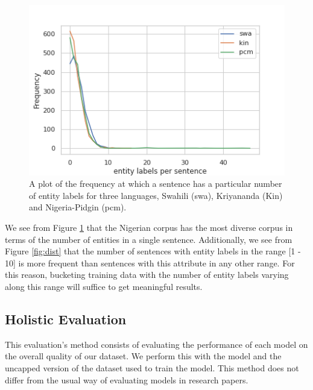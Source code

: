 \documentclass{article}
\begin{document}
\begin{figure}
    \centering
    \includegraphics[width=\columnwidth]{images/evlution.png}
    \caption{A plot of the frequency at which a sentence has a particular number of entity labels for three languages, Swahili (swa), Kriyananda (Kin) and Nigeria-Pidgin (pcm).}
    \label{fig:evolution}
\end{figure}

We see from Figure \ref{fig:evolution} that the Nigerian corpus has the most diverse corpus in terms of the number of entities in a single sentence. Additionally, we see from Figure \ref{fig:dist} that the number of sentences with entity labels in the range [1 - 10] is more frequent than sentences with this attribute in any other range. For this reason, bucketing training data with the number of entity labels varying along this range will suffice to get meaningful results.

\subsection{Holistic Evaluation}
This evaluation's method consists of evaluating the performance of each model on the overall quality of our dataset. We perform this with the model and the uncapped version of the dataset used to train the model. This method does not differ from the usual way of evaluating models in research papers.



\end{document}
